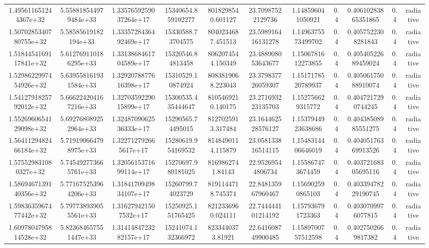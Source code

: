\begin{table}
\begin{tabular}{ccccccccccc}
1.495611651244367e+32 & 5.558818544979484e+33 & 1.3357659259037264e+17 & 15340654.859102277 & 8018298540.601127 & 23.70987522129736 & 1.148596041050921 & 0.4 & 0.40610283865351865 & 0.4 & radiative \\
1.5070285340780755e+32 & 5.58585619182194e+33 & 1.3335728436492469e+17 & 15330588.73704575 & 8040234687.451513 & 23.598916416131278 & 1.1496375573499702 & 0.4 & 0.4057522308281843 & 0.4 & radiative \\
1.5184454169117841e+32 & 5.612769110186295e+33 & 1.3313868461704589e+17 & 15320546.84813458 & 8062074544.150349 & 23.488908053643677 & 1.1506781612273855 & 0.4 & 0.40540522689459024 & 0.4 & radiative \\
1.5298622997454926e+32 & 5.639558161931584e+33 & 1.3292078877616398e+17 & 15310529.10874924 & 8083819068.223043 & 23.379837726059307 & 1.1517178520789937 & 0.4 & 0.40506175088910074 & 0.4 & radiative \\
1.5412791825792012e+32 & 5.666224204167216e+33 & 1.3270359229015899e+17 & 15300535.435444647 & 8105469210.140175 & 23.271693223135703 & 1.152756629315772 & 0.4 & 0.4047217290744245 & 0.4 & radiative \\
1.5526960654129098e+32 & 5.692768089252964e+33 & 1.3248709062536333e+17 & 15290565.74495015 & 8127025913.317484 & 23.164462528576127 & 1.1537944923638686 & 0.4 & 0.40438508985551275 & 0.4 & radiative \\
1.5641129482466184e+32 & 5.719190664798975e+33 & 1.322712792665617e+17 & 15280619.954169532 & 8148490114.115879 & 23.058133816514115 & 1.1548314406646019 & 0.4 & 0.40405176369913526 & 0.4 & radiative \\
1.575529831080327e+32 & 5.745492773665761e+33 & 1.3205615371699114e+17 & 15270697.980181025 & 8169862741.84143 & 22.95269544806734 & 1.155867473674459 & 0.4 & 0.40372168305695116 & 0.4 & radiative \\
1.5869467139140356e+32 & 5.771675253964206e+33 & 1.3184170949834107e+17 & 15260799.74023729 & 8191144718.745374 & 22.848135967960467 & 1.156902590865103 & 0.4 & 0.40339478229190745 & 0.4 & radiative \\
1.5983635967477442e+32 & 5.797738939055561e+33 & 1.316279421507532e+17 & 15250925.151765425 & 8212336960.024111 & 22.744444101214192 & 1.157936791723363 & 0.4 & 0.4030709976077815 & 0.4 & radiative \\
1.6097804795814528e+32 & 5.823684657551447e+33 & 1.3141484723282157e+17 & 15241074.132366972 & 8233440373.81921 & 22.641608749900485 & 1.1589700757512598 & 0.4 & 0.4027502669817382 & 0.4 & radiative \\

\end{tabular}
\end{table}
